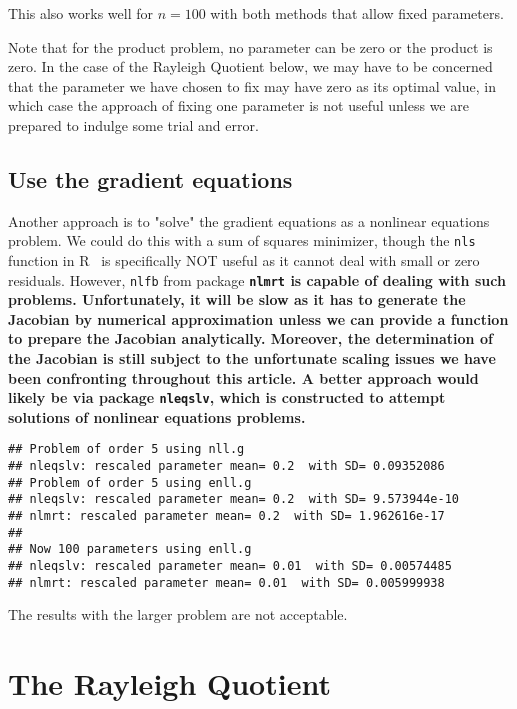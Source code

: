 \documentclass[11pt]{article}\usepackage[]{graphicx}\usepackage[]{color}
\makeatletter
\newenvironment{kframe}{%
 \def\at@end@of@kframe{}%
 \ifinner\ifhmode%
  \def\at@end@of@kframe{\end{minipage}}%
  \begin{minipage}{\columnwidth}%
 \fi\fi%
 \def\FrameCommand##1{\hskip\@totalleftmargin \hskip-\fboxsep
 \colorbox{shadecolor}{##1}\hskip-\fboxsep
     \hskip-\linewidth \hskip-\@totalleftmargin \hskip\columnwidth}%
 \MakeFramed {\advance\hsize-\width
   \@totalleftmargin\z@ \linewidth\hsize
   \@setminipage}}%
 {\par\unskip\endMakeFramed%
 \at@end@of@kframe}
\newenvironment{knitrout}{}{} %
\newcommand{\R}{{\sf R }}
\newcommand{\code}[1]{{\tt#1}}
\newcommand{\pkg}[1]{\bf{\tt#1}\rm }
\makeatother
\begin{document}
This also works well for $n=100$ with both methods that allow fixed parameters.

Note that for the product problem, no parameter can be zero or the product is zero.
In the case of the Rayleigh Quotient below, we may have to be concerned that the
parameter we have chosen to fix may have zero as its optimal value, in which case
the approach of fixing one parameter is not useful unless we are prepared to 
indulge some trial and error. 

\subsection{Use the gradient equations}

Another approach is to "solve" the gradient equations as a nonlinear equations
problem. We could do this with 
a sum of squares minimizer, though the \code{nls} function in \R\ is 
specifically NOT useful as it cannot deal
with small or zero residuals. However, \code{nlfb} 
from package \pkg{nlmrt} is capable of dealing
with such problems. Unfortunately, it will be slow as it has to 
generate the Jacobian by numerical
approximation unless we can provide a function to prepare the 
Jacobian analytically. Moreover,
the determination of the Jacobian is still subject to 
the unfortunate scaling issues we have
been confronting throughout this article. A better approach
would likely be via package \code{nleqslv}, which is constructed
to attempt solutions of nonlinear equations problems. 

\begin{knitrout}\scriptsize
{}\color{fgcolor}\begin{kframe}
\begin{verbatim}
## Problem of order 5 using nll.g
## nleqslv: rescaled parameter mean= 0.2  with SD= 0.09352086
## Problem of order 5 using enll.g
## nleqslv: rescaled parameter mean= 0.2  with SD= 9.573944e-10
## nlmrt: rescaled parameter mean= 0.2  with SD= 1.962616e-17
## 
## Now 100 parameters using enll.g
## nleqslv: rescaled parameter mean= 0.01  with SD= 0.00574485
## nlmrt: rescaled parameter mean= 0.01  with SD= 0.005999938
\end{verbatim}
\end{kframe}
\end{knitrout}

The results with the larger problem are not acceptable. 

\section{The Rayleigh Quotient}
\end{document}
